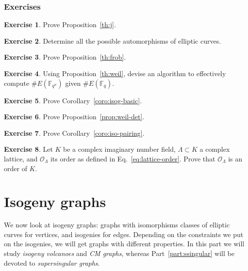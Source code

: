 \documentclass[10pt]{article}
\theoremstyle{plain}
\theoremstyle{definition}
\newtheorem{exercise}{Exercise}[part]
\def\F{\ensuremath{\mathbb{F}}}
\def\O{\ensuremath{\mathcal{O}}}
\begin{document}
\section*{Exercises}

\begin{exercise}
  Prove Proposition~\ref{th:j}.
\end{exercise}

\begin{exercise}
  Determine all the possible automorphisms of elliptic curves.
\end{exercise}

\begin{exercise}
  Prove Proposition~\ref{th:frob}.
\end{exercise}

\begin{exercise}
  Using Proposition~\ref{th:weil}, devise an algorithm to effectively
  compute $\#E(\F_{q^n})$ given $\#E(\F_q)$.
\end{exercise}

\begin{exercise}
  Prove Corollary~\ref{coro:isog-basic}.
\end{exercise}

\begin{exercise}
  Prove Proposition~\ref{prop:weil-det}.
\end{exercise}

\begin{exercise}
  Prove Corollary~\ref{coro:iso-pairing}.
\end{exercise}

\begin{exercise}
  Let $K$ be a complex imaginary number field, $Λ⊂K$ a complex
  lattice, and $\O_Λ$ its order as defined in
  Eq.~\eqref{eq:lattice-order}. %
  Prove that $\O_Λ$ is an order of $K$.
\end{exercise}



\clearpage
\part{Isogeny graphs}

We now look at isogeny graphs: graphs with isomorphisms classes of
elliptic curves for vertices, and isogenies for edges. %
Depending on the constraints we put on the isogenies, we will get
graphs with different properties. %
In this part we will study \emph{isogeny volcanoes} and \emph{CM graphs},
whereas Part~\ref{part:ssingular} will be devoted to
\emph{supersingular graphs}.
\end{document}
